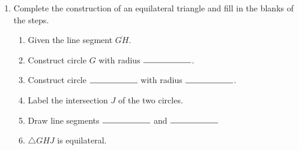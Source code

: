 \documentclass[12pt, oneside]{article}
\begin{document}
\begin{enumerate}
      \item Complete the construction of an equilateral triangle and fill in the blanks of the steps.
      \begin{enumerate}
        \item Given the line segment $\overline{GH}$. \bigskip
        \item Construct circle $G$ with radius $\rule{2cm}{0.15mm}$. \bigskip
        \item Construct circle $\rule{2cm}{0.15mm}$  with radius $\rule{2cm}{0.15mm}$. \bigskip
        \item Label the intersection $J$ of the two circles. \bigskip
        \item Draw line segments $\rule{2cm}{0.15mm}$  and $\rule{2cm}{0.15mm}$
        \item $\triangle GHJ$ is equilateral.
      \end{enumerate}
      \vspace{5cm}
      \begin{center}
      \end{center}

    \end{enumerate}

  \newpage
\end{document}
